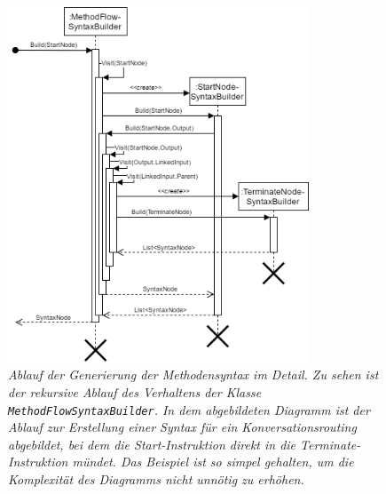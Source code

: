 \begin{figure} %
	\centering
		\includegraphics[width=0.8\textwidth]{img/TransformationSequenceDetail.png}
	\caption[Transformationsablauf im Detail]{\textit{Ablauf der Generierung der Methodensyntax im Detail. Zu sehen ist der rekursive Ablauf des Verhaltens der Klasse \texttt{MethodFlowSyntaxBuilder}. In dem abgebildeten Diagramm ist der Ablauf zur Erstellung einer Syntax für ein Konversationsrouting  abgebildet, bei dem die Start-Instruktion direkt in die Terminate-Instruktion mündet. Das Beispiel ist so simpel gehalten, um die Komplexität des Diagramms nicht unnötig zu erhöhen.}}
	\label{fig:UML:TransformationSequenceDetail}
\end{figure}
